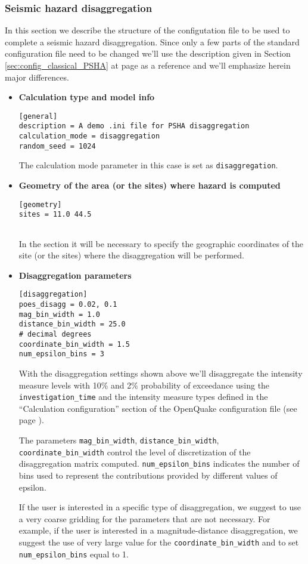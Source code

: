 \subsubsection{Seismic hazard disaggregation}
%
In this section we describe the structure of the configutation 
file to be used to complete a seismic hazard disaggregation. 
Since only a few parts of the standard configuration file need to 
be changed we'll use the description given in Section 
\ref{sec:config_classical_PSHA} at page 
\pageref{sec:config_classical_PSHA} as a reference and we'll 
emphasize herein major differences.
%
\begin{itemize}
%
\item \textbf{Calculation type and model info}
\begin{Verbatim}[frame=single, commandchars=\\\{\}, fontsize=\small]
[general]
description = A demo .ini file for PSHA disaggregation
calculation_mode = disaggregation
random_seed = 1024
\end{Verbatim}
The calculation mode parameter in this case is set as 
\texttt{disaggregation}.
%
\item \textbf{Geometry of the area (or the sites) where hazard is computed}
\begin{Verbatim}[frame=single, commandchars=\\\{\}, fontsize=\small]
[geometry]
sites = 11.0 44.5


\end{Verbatim}
In the section it will be necessary to specify the geographic 
coordinates of the site (or the sites) where the disaggregation
will be performed.
%
\item \textbf{Disaggregation parameters}
\begin{Verbatim}[frame=single, commandchars=\\\{\}, fontsize=\small]
[disaggregation]
poes_disagg = 0.02, 0.1
mag_bin_width = 1.0
distance_bin_width = 25.0
# decimal degrees
coordinate_bin_width = 1.5
num_epsilon_bins = 3
\end{Verbatim}
With the disaggregation settings shown above we'll disaggregate the intensity
measure levels with 10\% and 2\% probability of exceedance using the
\texttt{in\-ves\-ti\-gation\_time} and the intensity measure types 
defined in the ``Calculation configuration'' section of the OpenQuake
configuration file (see page \pageref{sec:calculation_configuration}). 

The parameters \texttt{mag\_bin\_width},  \texttt{distance\_bin\_width},
\texttt{coordinate\_bin\_width} control the level of discretization of the
disaggregation matrix computed. \texttt{num\_epsilon\_bins} indicates the 
number of bins used to represent the contributions provided by different
values of epsilon.

If the user is interested in a specific type of disaggregation,
we suggest to use a very coarse gridding for the parameters that are 
not necessary. For example, if the user is interested in a magnitude-distance 
disaggregation, we suggest the use of very large value for the 
\texttt{coordinate\_\-bin\_\-width} and to set  \texttt{num\_epsilon\_bins}
equal to 1.
\end{itemize}

